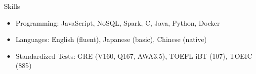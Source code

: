 \documentclass{cv}
\begin{document}



\begin{cvSection}{Skills}

\begin{itemize}[label=$\cdot$,leftmargin=0em]

\item Programming: JavaScript, NoSQL, Spark, C, Java, Python, Docker
\item Languages: English (fluent), Japanese (basic), Chinese (native)
\item Standardized Tests: GRE (V160, Q167, AWA3.5), TOEFL iBT (107), TOEIC (885)

\end{itemize}

\end{cvSection}
\end{document}
